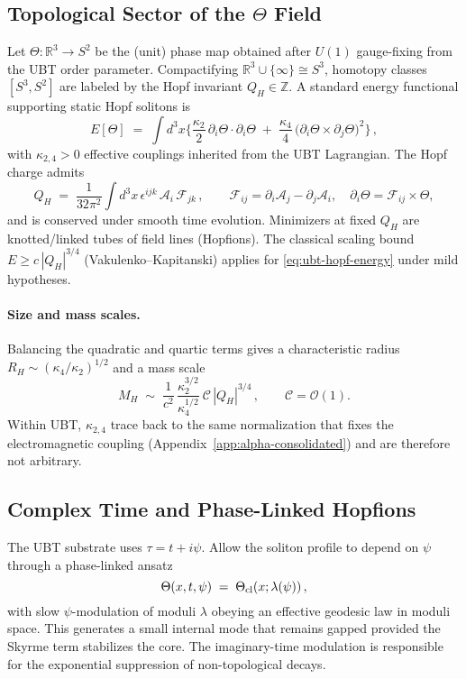 \subsection{Topological Sector of the $\Theta$ Field}
Let $\Theta:\mathbb{R}^3\!\to\!S^2$ be the (unit) phase map obtained after $U(1)$ gauge-fixing from the UBT order parameter.
Compactifying $\mathbb{R}^3\cup\{\infty\}\cong S^3$, homotopy classes $[S^3,S^2]$ are labeled by the Hopf invariant $Q_H\in\mathbb{Z}$.
A standard energy functional supporting static Hopf solitons is
\begin{equation}
\label{eq:ubt-hopf-energy}
E[\Theta] \;=\; \int d^3x \Big\{ \frac{\kappa_2}{2}\,\partial_i\Theta\!\cdot\!\partial_i\Theta \;+\; \frac{\kappa_4}{4}\,\big(\partial_i\Theta\times\partial_j\Theta\big)^2 \Big\}\,,
\end{equation}
with $\kappa_{2,4}>0$ effective couplings inherited from the UBT Lagrangian. The Hopf charge admits
\begin{equation}
Q_H \;=\; \frac{1}{32\pi^2}\int d^3x\,\epsilon^{ijk}\,\mathcal{A}_i\,\mathcal{F}_{jk}\,,\qquad
\mathcal{F}_{ij}=\partial_i\mathcal{A}_j-\partial_j\mathcal{A}_i,\quad
\partial_i\Theta=\mathcal{F}_{ij}\times \Theta,
\end{equation}
and is conserved under smooth time evolution. Minimizers at fixed $Q_H$ are knotted/linked tubes of field lines (Hopfions).
The classical scaling bound $E \ge c\,|Q_H|^{3/4}$ (Vakulenko--Kapitanski) applies for \eqref{eq:ubt-hopf-energy} under mild hypotheses.

\paragraph{Size and mass scales.}
Balancing the quadratic and quartic terms gives a characteristic radius $R_H\sim(\kappa_4/\kappa_2)^{1/2}$ and a mass scale
\begin{equation}
M_H \;\sim\; \frac{1}{c^2}\,\frac{\kappa_2^{3/2}}{\kappa_4^{1/2}}\ \mathcal{C}\,|Q_H|^{3/4}\,,\qquad \mathcal{C}=\mathcal{O}(1).
\end{equation}
Within UBT, $\kappa_{2,4}$ trace back to the same normalization that fixes the electromagnetic coupling (Appendix~\ref{app:alpha-consolidated})
and are therefore not arbitrary.

\subsection{Complex Time and Phase-Linked Hopfions}
The UBT substrate uses $\tau=t+i\psi$. Allow the soliton profile to depend on $\psi$ through a phase-linked ansatz
\begin{equation}
\Theta(x,t,\psi) \;=\; \Theta_{\rm cl}(x;\lambda(\psi))\,,
\end{equation}
with slow $\psi$-modulation of moduli $\lambda$ obeying an effective geodesic law in moduli space.
This generates a small internal mode that remains gapped provided the Skyrme term stabilizes the core.
The imaginary-time modulation is responsible for the exponential suppression of non-topological decays.

